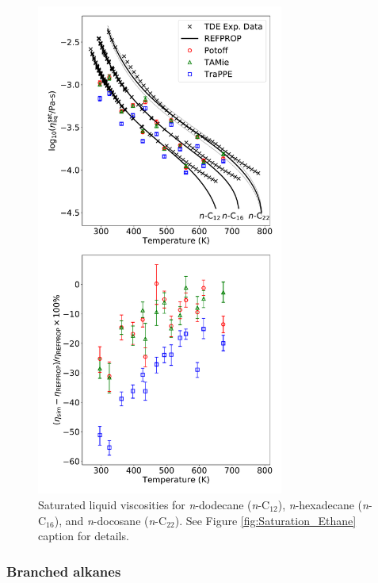 \documentclass[preprint,review,12pt]{elsarticle}
\begin{document}
	
	\begin{figure}[htb!]
		\centering
		\includegraphics[width=3.2in]{compare_force_fields_long_normal.pdf}
		\caption{Saturated liquid viscosities for \textit{n}-dodecane (\textit{n}-C$_{12}$), \textit{n}-hexadecane (\textit{n}-C$_{16}$), and \textit{n}-docosane (\textit{n}-C$_{22}$). See Figure \ref{fig:Saturation_Ethane} caption for details.}
		\label{fig:Saturation_C12_C16_C22}
	\end{figure} 
	
	\subsubsection{Branched alkanes}
	
	
\end{document}
